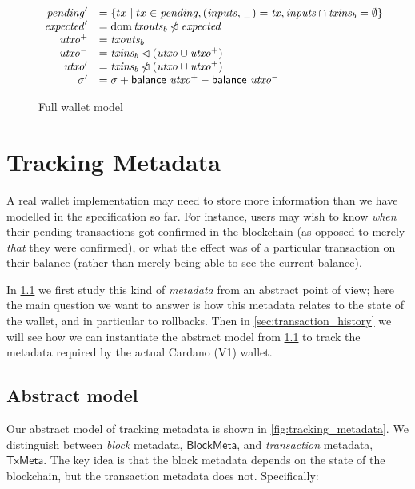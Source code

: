 \documentclass{article}
\newcommand{\restrictdom}{\lhd}
\newcommand{\subtractdom}{\mathbin{\slashed{\restrictdom}}}
\DeclareMathOperator{\dom}{dom}
\theoremstyle{definition}{
  \newtheorem{lemma}{Lemma}[section] %
  \newtheorem{definition}[lemma]{Definition}
}
\theoremstyle{theorem}{
  \newtheorem{invariant}[lemma]{Invariant}
  \newtheorem{proofobligation}[lemma]{Proof Obligation}
}
\numberwithin{equation}{lemma}
\begin{document}
\begin{figure}
\begin{align*}
\begin{array}[t]{rl}
     \mathit{pending}'  & = \{ tx \mid tx \in \mathit{pending}, (\mathit{inputs}, \,\underline{\phantom{a}}\,) = \mathit{tx}, \mathit{inputs} \cap \mathit{txins}_b = \emptyset \} \\
     \mathit{expected}' & = \dom \mathit{txouts}_b \subtractdom \mathit{expected} \\
     \mathit{utxo}^+    & = \mathit{txouts}_b \\
     \mathit{utxo}^-    & = \mathit{txins}_b \restrictdom (\mathit{utxo} \cup \mathit{utxo}^+) \\
     \mathit{utxo}'     & = \mathit{txins}_b \subtractdom (\mathit{utxo} \cup \mathit{utxo}^+) \\
     \sigma'            & = \sigma + \mathsf{balance} ~ \mathit{utxo}^+ - \mathsf{balance} ~ \mathit{utxo}^-
   \end{array}
\end{align*}

\caption{\label{fig:full_wallet_model}Full wallet model}
\end{figure}

\section{Tracking Metadata}

A real wallet implementation may need to store more information than
we have modelled in the specification so far. For instance, users may wish to
know \emph{when} their pending transactions got confirmed in the blockchain
(as opposed to merely \emph{that} they were confirmed), or what the effect
was of a particular transaction on their balance (rather than merely being
able to see the current balance).

In \cref{sec:abstract_metadata} we first study this kind of \emph{metadata}
from an abstract point of view; here the main question we want to answer is
how this metadata relates to the state of the wallet, and in particular to
rollbacks. Then in \cref{sec:transaction_history} we will see how
we can instantiate the abstract model from \cref{sec:abstract_metadata}
to track the metadata required by the actual Cardano (V1) wallet.

\subsection{Abstract model}
\label{sec:abstract_metadata}

Our abstract model of tracking metadata is shown in
\cref{fig:tracking_metadata}. We distinguish between \emph{block}
metadata, $\mathsf{BlockMeta}$, and \emph{transaction} metadata,
$\mathsf{TxMeta}$. The key idea is that the block metadata depends on the
state of the blockchain, but the transaction metadata does not. Specifically:
\end{document}
